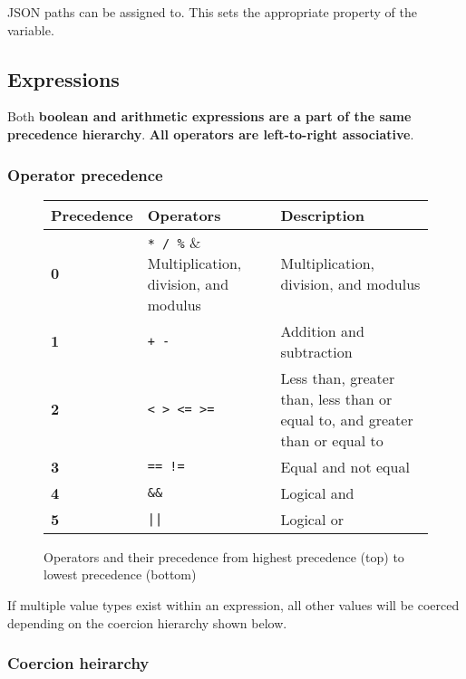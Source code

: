 \documentclass[12pt, letterpaper]{article}
\begin{document}
JSON paths can be assigned to. This sets the appropriate property of the variable.

\subsection{Expressions}
\label{sec:expressions}

Both \textbf{boolean and arithmetic expressions are a part of the same precedence hierarchy}. \textbf{All operators are left-to-right associative}.

\subsubsection{Operator precedence}

\begin{figure}[H]
    \begin{center}
        \begin{tabular}{| m{2cm} | m{2cm} | m{5cm} |}
            \hline
            Precedence & Operators & Description\\
            \hline
            \textbf{0} & \verb|* / %| & Multiplication, division, and modulus\\
            \hline
            \textbf{1} & \verb|+ -| & Addition and subtraction\\
            \hline
            \textbf{2} & \verb|< > <= >=| & Less than, greater than, less than or equal to, and greater than or equal to\\
            \hline
            \textbf{3} & \verb|== !=| & Equal and not equal\\
            \hline
            \textbf{4} & \verb|&&| & Logical and\\
            \hline
            \textbf{5} & \verb+||+ & Logical or\\
            \hline
        \end{tabular}
    \end{center}
    \caption{Operators and their precedence from highest precedence (top) to lowest precedence (bottom)}
\end{figure}

If multiple value types exist within an expression, all other values will be coerced depending on the coercion hierarchy shown below.

\subsubsection{Coercion heirarchy}
\end{document}
